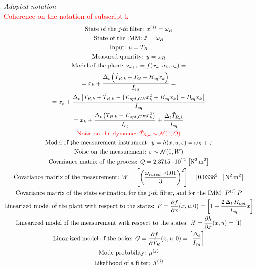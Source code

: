 \textit{Adopted notation}\\
\textcolor{red}{Coherence on the notation of subscript k}
\begin{multline}
  \text{State of the \textit{j-th} filter: } x^{(j)} = \omega_{R} \\
  \text{State of the IMM: } \hat{x} = \omega_R\\
  \text{Input: } u = T_{R}\\
  \text{Measured quantity: } y = \omega_{R} \\
  \text{Model of the plant: }  x_{k+1} = f(x_k, u_k, \nu_k) = \\ \notag
  = x_k + \frac{\Delta_t\left(\hat{T}_{R,k} - T_G - B_{eq}x_k\right)}{I_{eq}}=\\ \notag
  = x_k + \frac{\Delta_t\left[T_{R,k} + \tilde{T}_{R,k} - \left(K_{opt,GE}x_k^2 + B_{eq}x_k \right) - B_{eq}x_k\right]}{I_{eq}}\\ \notag
  = x_k + \frac{\Delta_t\left(T_{R,k}  - K_{opt,GE}x_k^2 \right)}{I_{eq}} + \frac{\Delta_t \tilde{T}_{R,k}}{I_{eq}}\\ 
  \textcolor{red}{\text{Noise on the dynamic: } \tilde{T}_{R,k} \sim \mathcal{N}(0, Q)} \\ \label{eq:noise_Q}
  \text{Model of the measurement instrument: } y = h(x, u, \varepsilon) = \omega_{R} + \varepsilon \\
  \text{Noise on the measurement: } \varepsilon \sim \mathcal{N}(0, W)  \\
  \text{Covariance matrix of the process: } Q = 2.3715\cdot10^{12} \, \left[\si{\square\newton\square \meter}\right]\\
  \text{Covariance matrix of the measurement: } W = \left[\left(\frac{\omega_{rated}\cdot 0.01}{3}\right)^2\right] = \left[0.0338^2\right] \, \left[\si{\square\newton\square \meter}\right]\\
  \text{Covariance matrix of the state estimation for the \textit{j-th} filter, and for the IMM: } P^{(j)} \, P\\
  \text{Linearized model of the plant with respect to the states: } F = \frac{\partial f}{\partial x}(x, u, 0) = \left[1-\frac{2\,\Delta_t\,K_{opt}}{I_{eq}}x\right]\\
  \text{Linearized model of the measurement with respect to the states: } H = \frac{\partial h}{\partial x}(x, u) = \left[1\right]\\
  \text{Linearized model of the noise: } G = \frac{\partial f}{\partial \tilde{T}_R}(x, u, 0)=\left[\frac{\Delta_t}{I_{eq}}\right]\\
  \text{Mode probability: } \mu^{(j)}\\
  \text{Likelihood of a filter: } \Lambda^{(j)}
\end{multline}

